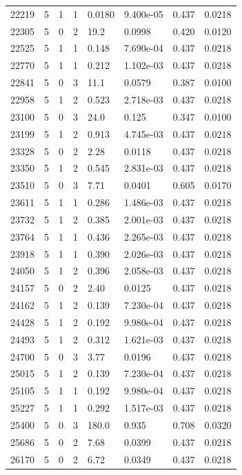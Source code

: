 \documentclass[preview]{standalone}
\begin{document}
{{{{{{\begin{tabular}{L{1.2cm}C{1.2cm} C{0.3cm}C{0.5cm} C{1.4cm}C{1.4cm} C{1.4cm}C{1.4cm}}
  22219  &     5  & 1     &  1 &  0.0180  & 9.400e-05  & 0.437 &  0.0218   \\ 
  22305  &     5  & 0     &  2 &  19.2  & 0.0998  & 0.420 &  0.0120   \\ 
  22525  &     5  & 1     &  1 &  0.148  & 7.690e-04  & 0.437 &  0.0218   \\ 
  22770  &     5  & 1     &  1 &  0.212  & 1.102e-03  & 0.437 &  0.0218   \\ 
  22841  &     5  & 0     &  3 &  11.1  & 0.0579  & 0.387 &  0.0100   \\ 
  22958  &     5  & 1     &  2 &  0.523  & 2.718e-03  & 0.437 &  0.0218   \\ 
  23100  &     5  & 0     &  3 &  24.0  & 0.125  & 0.347 &  0.0100   \\ 
  23199  &     5  & 1     &  2 &  0.913  & 4.745e-03  & 0.437 &  0.0218   \\ 
  23328  &     5  & 0     &  2 &  2.28  & 0.0118  & 0.437 &  0.0218   \\ 
  23350  &     5  & 1     &  2 &  0.545  & 2.831e-03  & 0.437 &  0.0218   \\ 
  23510  &     5  & 0     &  3 &  7.71  & 0.0401  & 0.605 &  0.0170   \\ 
  23611  &     5  & 1     &  1 &  0.286  & 1.486e-03  & 0.437 &  0.0218   \\ 
  23732  &     5  & 1     &  2 &  0.385  & 2.001e-03  & 0.437 &  0.0218   \\ 
  23764  &     5  & 1     &  1 &  0.436  & 2.265e-03  & 0.437 &  0.0218   \\ 
  23918  &     5  & 1     &  1 &  0.390  & 2.026e-03  & 0.437 &  0.0218   \\ 
  24050  &     5  & 1     &  2 &  0.396  & 2.058e-03  & 0.437 &  0.0218   \\ 
  24157  &     5  & 0     &  2 &  2.40  & 0.0125  & 0.437 &  0.0218   \\ 
  24162  &     5  & 1     &  2 &  0.139  & 7.230e-04  & 0.437 &  0.0218   \\ 
  24428  &     5  & 1     &  2 &  0.192  & 9.980e-04  & 0.437 &  0.0218   \\ 
  24493  &     5  & 1     &  2 &  0.312  & 1.621e-03  & 0.437 &  0.0218   \\ 
  24700  &     5  & 0     &  3 &  3.77  & 0.0196  & 0.437 &  0.0218   \\ 
  25015  &     5  & 1     &  2 &  0.139  & 7.230e-04  & 0.437 &  0.0218   \\ 
  25105  &     5  & 1     &  1 &  0.192  & 9.980e-04  & 0.437 &  0.0218   \\ 
  25227  &     5  & 1     &  1 &  0.292  & 1.517e-03  & 0.437 &  0.0218   \\ 
  25400  &     5  & 0     &  3 &  180.0  & 0.935  & 0.708 &  0.0320   \\ 
  25686  &     5  & 0     &  2 &  7.68  & 0.0399  & 0.437 &  0.0218   \\ 
  26170  &     5  & 0     &  2 &  6.72  & 0.0349  & 0.437 &  0.0218   \\ 
\hline 
\end{tabular} 

}}}}}}
\end{document}
